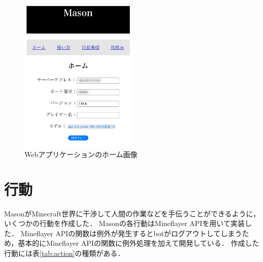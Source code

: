 \begin{figure}[H]
    \centering
    \includegraphics[width=0.5\textwidth]{fig/web_app.jpg}
    \caption{Webアプリケーションのホーム画像}
    \label{fig:web_app}
\end{figure}

\section{行動}\label{sec:act}
MasonがMinecraft世界に干渉して人間の作業などを手伝うことができるように，いくつかの行動を作成した．
Masonの各行動はMineflayer API\cite{bib:Mineflayer}を用いて実装した．
Mineflayer APIの関数は例外が発生するとbotがログアウトしてしまうため，基本的にMineflayer APIの関数に例外処理を加えて開発している．
作成した行動には表\ref{tab:action}の種類がある．

